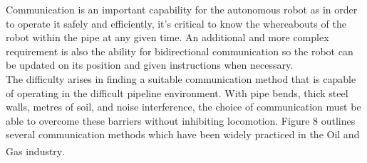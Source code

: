 \documentclass[11pt]{article}		%
\begin{document}
		Communication is an important capability for the autonomous robot as in order to operate it safely and efficiently, it's critical to know the whereabouts of the robot within the pipe at any given time. 
		An additional and more complex requirement is also the ability for bidirectional communication so the robot can be updated on its position and given instructions when necessary. 
		\\
	    The difficulty arises in finding a suitable communication method that is capable of operating in the difficult pipeline environment. 
	    With pipe bends, thick steel walls, metres of soil, and noise interference, the choice of communication must be able to overcome these barriers without inhibiting locomotion. 
	    Figure 8 outlines several communication methods which have been widely practiced in the Oil and Gas industry\textsuperscript{\cite{acoustic2020}}. %
	    \\
	    
\end{document}
